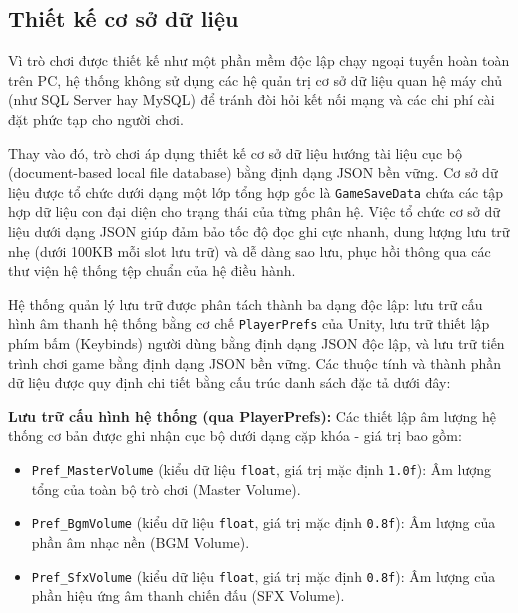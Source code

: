 \documentclass[../DoAn.tex]{subfiles}
\begin{document}
\subsection{Thiết kế cơ sở dữ liệu}
\label{subsection:5.3.2}
Vì trò chơi được thiết kế như một phần mềm độc lập chạy ngoại tuyến hoàn toàn trên PC, hệ thống không sử dụng các hệ quản trị cơ sở dữ liệu quan hệ máy chủ (như SQL Server hay MySQL) để tránh đòi hỏi kết nối mạng và các chi phí cài đặt phức tạp cho người chơi.

Thay vào đó, trò chơi áp dụng thiết kế cơ sở dữ liệu hướng tài liệu cục bộ (document-based local file database) bằng định dạng JSON bền vững. Cơ sở dữ liệu được tổ chức dưới dạng một lớp tổng hợp gốc là \texttt{GameSaveData} chứa các tập hợp dữ liệu con đại diện cho trạng thái của từng phân hệ. Việc tổ chức cơ sở dữ liệu dưới dạng JSON giúp đảm bảo tốc độ đọc ghi cực nhanh, dung lượng lưu trữ nhẹ (dưới 100KB mỗi slot lưu trữ) và dễ dàng sao lưu, phục hồi thông qua các thư viện hệ thống tệp chuẩn của hệ điều hành.

Hệ thống quản lý lưu trữ được phân tách thành ba dạng độc lập: lưu trữ cấu hình âm thanh hệ thống bằng cơ chế \texttt{PlayerPrefs} của Unity, lưu trữ thiết lập phím bấm (Keybinds) người dùng bằng định dạng JSON độc lập, và lưu trữ tiến trình chơi game bằng định dạng JSON bền vững. Các thuộc tính và thành phần dữ liệu được quy định chi tiết bằng cấu trúc danh sách đặc tả dưới đây:

\textbf{Lưu trữ cấu hình hệ thống (qua PlayerPrefs):}
Các thiết lập âm lượng hệ thống cơ bản được ghi nhận cục bộ dưới dạng cặp khóa - giá trị bao gồm:
\begin{itemize}
    \item \texttt{Pref\_MasterVolume} (kiểu dữ liệu \texttt{float}, giá trị mặc định \texttt{1.0f}): Âm lượng tổng của toàn bộ trò chơi (Master Volume).
    \item \texttt{Pref\_BgmVolume} (kiểu dữ liệu \texttt{float}, giá trị mặc định \texttt{0.8f}): Âm lượng của phần âm nhạc nền (BGM Volume).
    \item \texttt{Pref\_SfxVolume} (kiểu dữ liệu \texttt{float}, giá trị mặc định \texttt{0.8f}): Âm lượng của phần hiệu ứng âm thanh chiến đấu (SFX Volume).
\end{itemize}
\end{document}
